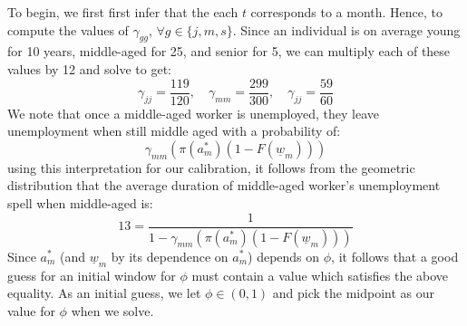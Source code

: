 \documentclass{article}
\newcommand{\lbar}[1]{\underline{#1}} %
\begin{document}
To begin, we first first infer that the each $t$ corresponds to a month. Hence, to compute the values of $\gamma_{gg}$, $\forall g\in\{j,m,s\}$. Since an individual is on average young for 10 years, middle-aged for 25, and senior for 5, we can multiply each of these values by 12 and solve to get:
\[
\gamma_{jj}=\frac{119}{120},\quad\gamma_{mm}=\frac{299}{300},\quad\gamma_{jj}=\frac{59}{60}
\]
We note that once a middle-aged worker is unemployed, they leave unemployment when still middle aged with a probability of:
\[
\gamma_{mm}(\pi(a^*_m)(1-F(\lbar{w}_m)))
\]
using this interpretation for our calibration, it follows from the geometric distribution that the average duration of middle-aged worker's unemployment spell when middle-aged is:
\[
13=\frac{1}{1-\gamma_{mm}(\pi(a^*_m)(1-F(\lbar{w}_m)))}
\]
Since $a^*_m$ (and $\lbar{w}_m$ by its dependence on $a^*_m$) depends on $\phi$, it follows that a good guess for an initial window for $\phi$ must contain a value which satisfies the above equality. As an initial guess, we let $\phi\in(0,1)$ and pick the midpoint as our value for $\phi$ when we solve. 
\end{document}
